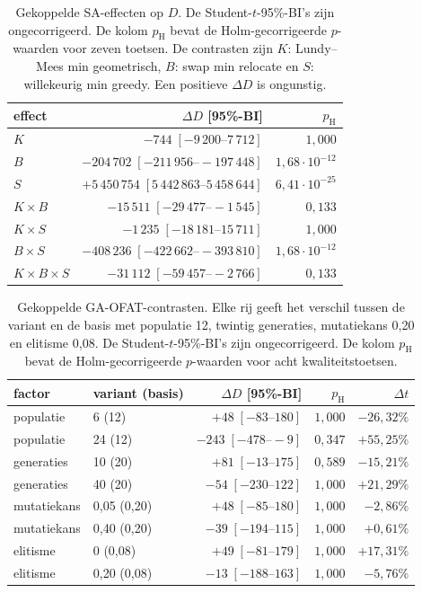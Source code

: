 \begin{table}[H]
\centering
\caption{Gekoppelde SA-effecten op $D$. De Student-$t$-95\%-BI's zijn
ongecorrigeerd. De kolom $p_{\mathrm H}$ bevat de Holm-gecorrigeerde $p$-waarden voor
zeven toetsen. De contrasten zijn $K$: Lundy--Mees min geometrisch, $B$: swap
min relocate en $S$: willekeurig min greedy. Een positieve $\Delta D$ is
ongunstig.}
\label{tab:app-sa-effects}
\begin{tabular}{@{}lrr@{}}
\toprule
\textbf{effect} & \textbf{$\Delta D$ [95\%-BI]} & \textbf{$p_{\mathrm H}$} \\
\midrule
$K$             & $-744\;[-9\,200\text{--}7\,712]$ & $1,000$ \\
$B$             & $-204\,702\;[-211\,956\text{--}-197\,448]$ & $1,68\!\cdot\!10^{-12}$ \\
$S$             & $+5\,450\,754\;[5\,442\,863\text{--}5\,458\,644]$ & $6,41\!\cdot\!10^{-25}$ \\
$K\times B$     & $-15\,511\;[-29\,477\text{--}-1\,545]$ & $0,133$ \\
$K\times S$     & $-1\,235\;[-18\,181\text{--}15\,711]$ & $1,000$ \\
$B\times S$     & $-408\,236\;[-422\,662\text{--}-393\,810]$ & $1,68\!\cdot\!10^{-12}$ \\
$K\times B\times S$ & $-31\,112\;[-59\,457\text{--}-2\,766]$ & $0,133$ \\
\bottomrule
\end{tabular}
\end{table}

\begin{table}[H]
\centering
\caption{Gekoppelde GA-OFAT-contrasten. Elke rij geeft het verschil tussen de
variant en de basis met populatie 12, twintig generaties, mutatiekans 0,20 en
elitisme 0,08. De Student-$t$-95\%-BI's zijn ongecorrigeerd. De kolom
$p_{\mathrm H}$ bevat de Holm-gecorrigeerde $p$-waarden voor acht kwaliteitstoetsen.}
\label{tab:app-ga}
\begin{tabular}{@{}llrrr@{}}
\toprule
\textbf{factor} & \textbf{variant (basis)} & \textbf{$\Delta D$ [95\%-BI]} &
\textbf{$p_{\mathrm H}$} & \textbf{$\Delta t$} \\
\midrule
populatie  & 6 (12)       & $+48\;[-83\text{--}180]$    & $1,000$ & $-26,32\%$ \\
populatie  & 24 (12)      & $-243\;[-478\text{--}-9]$   & $0,347$ & $+55,25\%$ \\
generaties & 10 (20)      & $+81\;[-13\text{--}175]$    & $0,589$ & $-15,21\%$ \\
generaties & 40 (20)      & $-54\;[-230\text{--}122]$   & $1,000$ & $+21,29\%$ \\
mutatiekans & 0,05 (0,20) & $+48\;[-85\text{--}180]$    & $1,000$ & $-2,86\%$ \\
mutatiekans & 0,40 (0,20) & $-39\;[-194\text{--}115]$   & $1,000$ & $+0,61\%$ \\
elitisme   & 0 (0,08)     & $+49\;[-81\text{--}179]$    & $1,000$ & $+17,31\%$ \\
elitisme   & 0,20 (0,08)  & $-13\;[-188\text{--}163]$   & $1,000$ & $-5,76\%$ \\
\bottomrule
\end{tabular}
\end{table}

